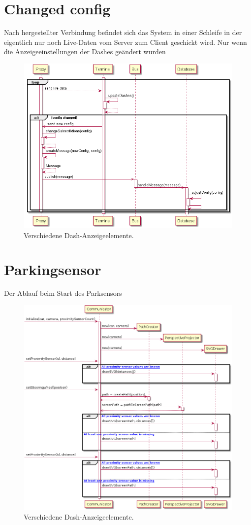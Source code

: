 \documentclass[entwurf.tex]{subfiles}
\begin{document}
  	\section{Changed config}
  		Nach hergestellter Verbindung befindet sich das System in einer Schleife in der eigentlich nur noch Live-Daten vom Server zum Client geschickt wird. Nur wenn die Anzeigeeinstellungen der Dashes geändert wurden 
  		\begin{figure}[H]
  			\begin{center}
 				\includegraphics[width=\textwidth]{diagrams/ChangeDashConfig.png}
  				\caption{Verschiedene Dash-Anzeigeelemente.}
  			\end{center}
  		\end{figure}
  		
  	\newpage
	\section{Parkingsensor}
		Der Ablauf beim Start des Parksensors
		\begin{figure}[H]
  			\begin{center}
 				\includegraphics[width=\textwidth]{diagrams/ParkingSensor/sequence_diagram.png}
  				\caption{Verschiedene Dash-Anzeigeelemente.}
  			\end{center}
  		\end{figure}
\end{document}
